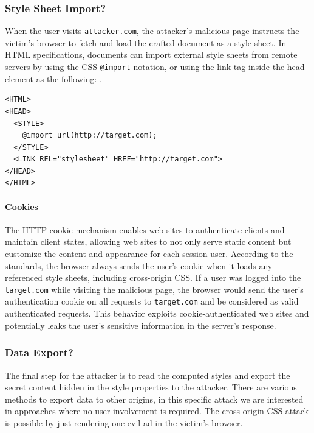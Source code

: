 \documentclass{acm_proc_article-sp}
\begin{document}
{\subsubsection{Style Sheet Import?}
When the user visits \texttt{attacker.com}, the attacker's malicious page instructs the victim's browser to fetch and load the crafted document as a style sheet. In HTML specifications\cite{html}, documents can import external style sheets from remote servers by using the CSS \texttt{@import} notation, or using the link tag inside the head element as the following: .
\begin{verbatim}
<HTML>
<HEAD>
  <STYLE>
    @import url(http://target.com);
  </STYLE>
  <LINK REL="stylesheet" HREF="http://target.com">
</HEAD>
</HTML>
\end{verbatim}
\paragraph{Cookies}
The HTTP cookie mechanism enables web sites to authenticate clients and maintain client states, allowing web sites to not only serve static content but customize the content and appearance for each session user. According to the standards, the browser always sends the user's cookie when it loads any referenced style sheets, including cross-origin CSS. If a user was logged into the \texttt{target.com} while visiting the malicious page, the browser would send the user's authentication cookie on all requests to \texttt{target.com} and be considered as valid authenticated requests. This behavior exploits cookie-authenticated web sites and potentially leaks the user's sensitive information in the server's response. 

\subsubsection{Data Export?}
The final step for the attacker is to read the computed styles and export the secret content hidden in the style properties to the attacker. There are various methods to export data to other origins, in this specific attack we are interested in approaches where no user involvement is required. The cross-origin CSS attack is possible by just rendering one evil ad in the victim's browser. 

}
\end{document}
